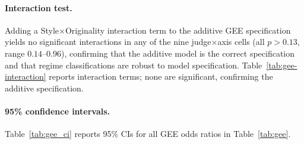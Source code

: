 \paragraph{Interaction test.}
Adding a Style$\times$Originality interaction term to the additive GEE specification yields no significant interactions in any of the nine judge$\times$axis cells (all $p > 0.13$, range $0.14$--$0.96$), confirming that the additive model is the correct specification and that regime classifications are robust to model specification.
Table~\ref{tab:gee-interaction} reports interaction terms; none are significant, confirming the additive specification.

\begin{table}[h]
\centering
\small
\caption{GEE Style $\times$ Originality interaction terms. None are significant ($p > 0.13$), confirming the additive model specification.}
\label{tab:gee-interaction}
\end{table}

\paragraph{95\% confidence intervals.}
Table~\ref{tab:gee_ci} reports 95\% CIs for all GEE odds ratios in Table~\ref{tab:gee}.

